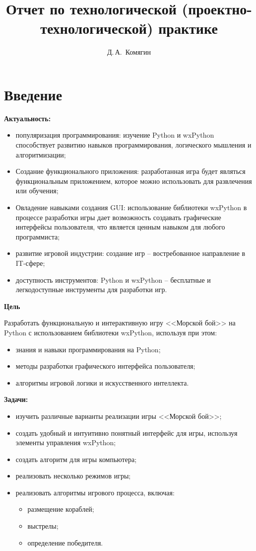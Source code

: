 \documentclass[14pt, oneside]{altsu-report}
\title{Отчет по технологической (проектно-технологической) практике}
\author{Д.\,А.~Комягин}
\institute{Институт цифровых технологий, электроники и физики}
\date{\the\year}
\begin{document}
\maketitle

\setcounter{page}{2}
\makeabstract
\tableofcontents

\chapter*{Введение}

\textbf{Актуальность:}
\begin{itemize}
\item популяризация программирования: изучение Python и wxPython способствует развитию навыков программирования, логического мышления и алгоритмизации;
\item Создание функционального приложения: разработанная игра будет являться функциональным приложением, которое можно использовать для развлечения или обучения;
\item Овладение навыками создания GUI: использование библиотеки wxPython в процессе разработки игры дает возможность создавать графические интерфейсы пользователя, что является ценным навыком для любого программиста;
\item развитие игровой индустрии: создание игр – востребованное направление в IT-сфере;
\item доступность инструментов: Python и wxPython – бесплатные и легкодоступные инструменты для разработки игр.
\end{itemize}

\textbf{Цель}

Разработать функциональную и интерактивную игру <<Морской бой>> на Python с использованием библиотеки wxPython, используя при этом:
\begin{itemize}
\item знания и навыки программирования на Python;
\item методы разработки графического интерфейса пользователя;
\item алгоритмы игровой логики и искусственного интеллекта.
\end{itemize}

\textbf{Задачи:}

\begin{itemize}
\item изучить различные варианты реализации игры <<Морской бой>>;
\item создать удобный и интуитивно понятный интерфейс для игры, используя элементы управления wxPython;
\item создать алгоритм для игры компьютера;
\item реализовать несколько режимов игры;
\item реализовать алгоритмы игрового процесса, включая:
\begin{itemize}
    \item размещение кораблей;
    \item выстрелы;
    \item определение победителя.
\end{itemize}
\end{itemize}
\end{document}
